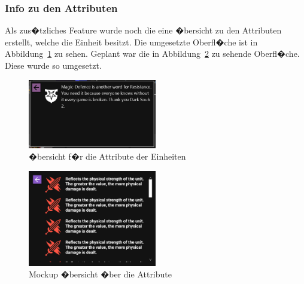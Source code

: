 \documentclass[12pt, titlepage]{scrartcl}
\newcommand{\Abb}[1]{%
	Abbildung\ \ref{#1}%
}
\begin{document}
			\subsubsection{Info zu den Attributen}
			Als zus�tzliches Feature wurde noch die eine �bersicht zu den Attributen erstellt, welche die Einheit besitzt. Die umgesetzte Oberfl�che ist in \Abb{AttributInfo} zu sehen. Geplant war die in \Abb{MockupAttribute} zu sehende Oberfl�che. Diese wurde so umgesetzt.
			
			\begin{figure}[H] 
				\centering
				\includegraphics[width=0.5\textwidth]{Attribute_Info_final.PNG}
				\caption{�bersicht f�r die Attribute der Einheiten}
				\label{AttributInfo}
			\end{figure}
		
			\begin{figure}[H] 
				\centering
				\includegraphics[width=0.5\textwidth]{InfoView.png}
				\caption{Mockup �bersicht �ber die Attribute}
				\label{MockupAttribute}
			\end{figure}
		
\end{document}
